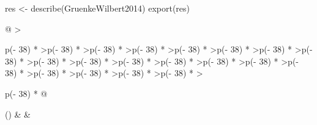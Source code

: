 \documentclass[
  letterpaper,
  DIV=11,
  numbers=noendperiod]{scrreprt}
\newenvironment{Shaded}{\begin{snugshade}}{\end{snugshade}}
\newcommand{\FunctionTok}[1]{\textcolor[rgb]{0.28,0.35,0.67}{#1}}
\newcommand{\NormalTok}[1]{\textcolor[rgb]{0.00,0.23,0.31}{#1}}
\newcommand{\OtherTok}[1]{\textcolor[rgb]{0.00,0.23,0.31}{#1}}
\begin{document}
\begin{Shaded}
\begin{Highlighting}[]
\NormalTok{res }\OtherTok{\textless{}{-}} \FunctionTok{describe}\NormalTok{(GruenkeWilbert2014)}
\FunctionTok{export}\NormalTok{(res)}
\end{Highlighting}
\end{Shaded}

\begin{longtable}[]{@{}
  >{\raggedright\arraybackslash}p{(\columnwidth - 38\tabcolsep) * }
  >{\centering\arraybackslash}p{(\columnwidth - 38\tabcolsep) * }
  >{\centering\arraybackslash}p{(\columnwidth - 38\tabcolsep) * }
  >{\centering\arraybackslash}p{(\columnwidth - 38\tabcolsep) * }
  >{\centering\arraybackslash}p{(\columnwidth - 38\tabcolsep) * }
  >{\centering\arraybackslash}p{(\columnwidth - 38\tabcolsep) * }
  >{\centering\arraybackslash}p{(\columnwidth - 38\tabcolsep) * }
  >{\centering\arraybackslash}p{(\columnwidth - 38\tabcolsep) * }
  >{\centering\arraybackslash}p{(\columnwidth - 38\tabcolsep) * }
  >{\centering\arraybackslash}p{(\columnwidth - 38\tabcolsep) * }
  >{\centering\arraybackslash}p{(\columnwidth - 38\tabcolsep) * }
  >{\centering\arraybackslash}p{(\columnwidth - 38\tabcolsep) * }
  >{\centering\arraybackslash}p{(\columnwidth - 38\tabcolsep) * }
  >{\centering\arraybackslash}p{(\columnwidth - 38\tabcolsep) * }
  >{\centering\arraybackslash}p{(\columnwidth - 38\tabcolsep) * }
  >{\centering\arraybackslash}p{(\columnwidth - 38\tabcolsep) * }
  >{\centering\arraybackslash}p{(\columnwidth - 38\tabcolsep) * }
  >{\centering\arraybackslash}p{(\columnwidth - 38\tabcolsep) * }
  >{\centering\arraybackslash}p{(\columnwidth - 38\tabcolsep) * }
  >{\raggedright\arraybackslash}p{(\columnwidth - 38\tabcolsep) * }@{}}
\caption{Descriptive statistics}\tabularnewline
\toprule()
 &
 &

\end{longtable}
\end{document}

